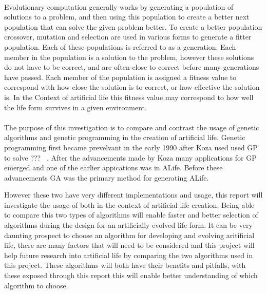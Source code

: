 \documentclass[10pt,twocolumn]{article}
\begin{document}
\paragraph{}
Evolutionary computation generally works by generating a population of solutions to a problem, and then using this population to create a better next population that can solve the given problem better.
To create a better population crossover, mutation and selection are used in various forms to generate a fitter population.
Each of these populations is referred to as a generation.
Each member in the population is a solution to the problem, however these solutions do not have to be correct, and are often close to correct before many generations have passed.
Each member of the population is assigned a fitness value to correspond with how close the solution is to correct, or how effective the solution is.
In the Context of artificial life this fitness value may correspond to how well the life form survives in a given environment.

\paragraph{}
The purpose of this investigation is to compare and contrast the usage of genetic algorithms and genetic programming in the creation of artificial life. Genetic programming first became prevelvant in the early 1990 after Koza used used GP to solve ??? ~\cite{Koza90}. After the advancements made by Koza many applications for GP emerged and one of the earlier appications was in ALife. Before these advancements GA was the primary method for generating ALife.

However these two have very different implementations and usage, this report will investigate the usage of both in the context of artificial life creation. 
Being able to compare this two types of algorithms will enable faster and better selection of algorithms during 
the design for an artificially evolved life form. It can be very daunting prospect to choose an algorithm
for developing and evolving aritificial life, there are many factors that will need to be considered and this
project will help future research into artificial life by comparing the two algorithms used in this project.
These algorithms will both have their benefits and pitfalls, with these exposed through this report this 
will enable better understanding of which algorithm to choose.
\end{document}
